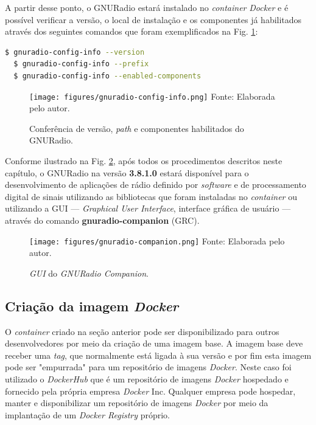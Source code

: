 \documentclass[
  12pt,				%
  openright,			%
  twoside,			%
  a4paper,			%
  english,			%
  french,				%
  spanish,			%
  brazil,				%
  ]{abntex2}
\begin{document}
A partir desse ponto, o GNURadio estará instalado no \textit{container} \textit{Docker} e é possível verificar a versão, o local de instalação e os
componentes já habilitados através dos seguintes comandos que foram exemplificados na Fig. \ref{fig:gnuradio-config-info}:

\begin{adjustbox}{max width=\linewidth}
  \begin{lstlisting}[language=bash]
  $ gnuradio-config-info --version
  $ gnuradio-config-info --prefix
  $ gnuradio-config-info --enabled-components
\end{lstlisting}
\end{adjustbox}

\begin{figure}[!htb]
  \centering
  \caption{Conferência de versão, \textit{path} e componentes habilitados do GNURadio.}
  \texttt{[image: figures/gnuradio-config-info.png]}
  Fonte: Elaborada pelo autor.
  \label{fig:gnuradio-config-info}
\end{figure}

Conforme ilustrado na Fig. \ref{fig:gnuradio-companion}, após todos os procedimentos descritos neste capítulo, o GNURadio na versão \textbf{3.8.1.0} estará
disponível para o desenvolvimento de aplicações de rádio definido por \textit{software} e de processamento digital de sinais utilizando as bibliotecas
que foram instaladas no \textit{container} ou utilizando a GUI — \textit{Graphical User Interface}, interface gráfica de usuário —
através do comando \textbf{gnuradio-companion} (GRC).

\begin{figure}[!htb]
  \centering
  \caption{\textit{GUI} do \textit{GNURadio Companion}.}
  \texttt{[image: figures/gnuradio-companion.png]}
  Fonte: Elaborada pelo autor.
  \label{fig:gnuradio-companion}
\end{figure}

\subsection*{Criação da imagem \textit{Docker}}

O \textit{container} criado na seção anterior pode ser disponibilizado para outros desenvolvedores por meio da criação de uma imagem
base. A imagem base deve receber uma \textit{tag}, que normalmente está ligada à sua versão e por fim esta imagem pode ser
"empurrada" para um repositório de imagens \textit{Docker}. Neste caso foi utilizado o \textit{DockerHub} que é um repositório
de imagens \textit{Docker} hospedado e fornecido pela própria empresa \textit{Docker} Inc. Qualquer empresa pode hospedar, manter
e disponibilizar um repositório de imagens \textit{Docker} por meio da implantação de um \textit{Docker Registry} próprio.
\end{document}
